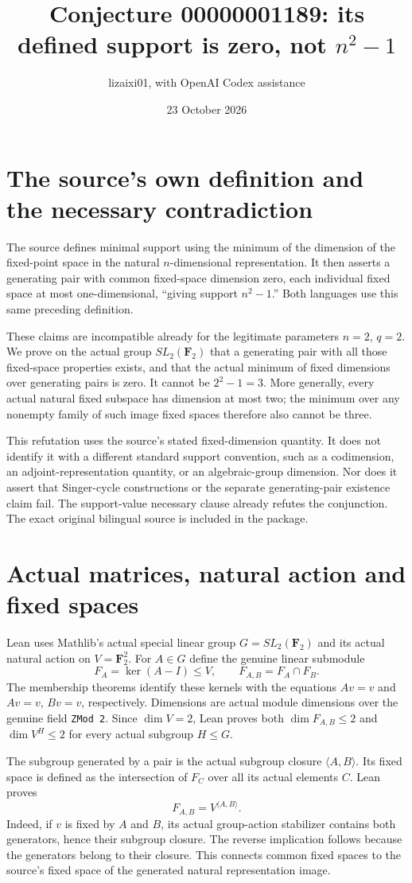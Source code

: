 \documentclass[11pt]{article}
\title{Conjecture 00000001189: its defined support is zero, not $n^2-1$}
\author{lizaixi01, with OpenAI Codex assistance}
\date{23 October 2026}
\begin{document}
\maketitle
\section{The source's own definition and the necessary contradiction}
The source defines minimal support using the minimum of the dimension
of the fixed-point space in the natural $n$-dimensional representation.
It then asserts a generating pair with common fixed-space dimension
zero, each individual fixed space at most one-dimensional, ``giving
support $n^2-1$.'' Both languages use this same preceding definition.

These claims are incompatible already for the legitimate parameters
$n=2$, $q=2$. We prove on the actual group $SL_2(\mathbf F_2)$ that a
generating pair with all those fixed-space properties exists, and that
the actual minimum of fixed dimensions over generating pairs is zero.
It cannot be $2^2-1=3$. More generally, every actual natural fixed
subspace has dimension at most two; the minimum over any nonempty
family of such image fixed spaces therefore also cannot be three.

This refutation uses the source's stated fixed-dimension quantity.
It does not identify it with a different standard support convention,
such as a codimension, an adjoint-representation quantity, or an
algebraic-group dimension. Nor does it assert that Singer-cycle
constructions or the separate generating-pair existence claim fail.
The support-value necessary clause already refutes the conjunction.
The exact original bilingual source is included in the package.

\section{Actual matrices, natural action and fixed spaces}
Lean uses Mathlib's actual special linear group
$G=SL_2(\mathbf F_2)$ and its actual natural action on
$V=\mathbf F_2^2$. For $A\in G$ define the genuine linear submodule
\[
 F_A=\ker(A-I)\le V,\qquad F_{A,B}=F_A\cap F_B.
\]
The membership theorems identify these kernels with the equations
$Av=v$ and $Av=v$, $Bv=v$, respectively. Dimensions are actual
module dimensions over the genuine field \texttt{ZMod 2}.
Since $\dim V=2$, Lean proves both $\dim F_{A,B}\le2$ and
$\dim V^H\le2$ for every actual subgroup $H\le G$.

The subgroup generated by a pair is the actual subgroup closure
$\langle A,B\rangle$. Its fixed space is defined as the intersection
of $F_C$ over all its actual elements $C$. Lean proves
\[
 F_{A,B}=V^{\langle A,B\rangle}.
\]
Indeed, if $v$ is fixed by $A$ and $B$, its actual group-action
stabilizer contains both generators, hence their subgroup closure.
The reverse implication follows because the generators belong to
their closure. This connects common fixed spaces to the source's
fixed space of the generated natural representation image.
\end{document}
